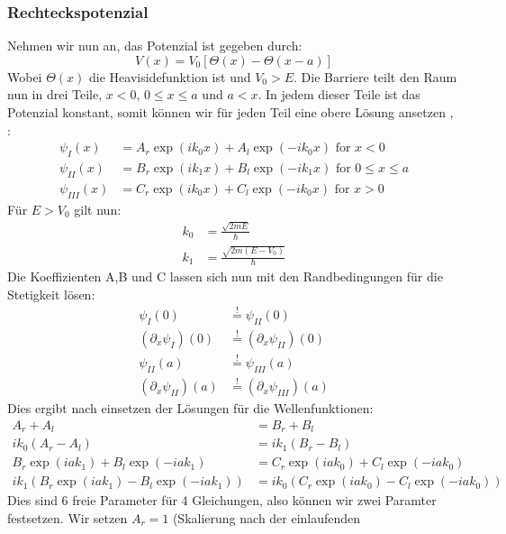 \subsubsection{Rechteckspotenzial}
Nehmen wir nun an, das Potenzial ist gegeben durch:
\begin{equation}
    V(x) = V_0 \left [ \Theta(x) - \Theta(x-a) \right ] 
\end{equation}
Wobei $\Theta(x)$ die Heavisidefunktion ist und $V_0 > E$.
Die Barriere teilt den Raum nun in drei Teile, $x<0$, $0\leqslant x\leqslant a$ und $a<x$.
In jedem dieser Teile ist das Potenzial konstant, somit können wir für jeden Teil eine
obere Lösung ansetzen \cite{wolfgang2010experimentalphysik},
\cite{landau1991quantenmechanik}:
\begin{align}
    \psi_I(x)    &= A_r \exp(ik_0x) + A_l  \exp(-ik_0x) \mbox{ for } x<0\\
    \psi_{II}(x) &= B_r \exp(ik_1x) + B_l  \exp(-ik_1x) \mbox{ for } 0 \leqslant x \leqslant a\\
    \psi_{III}(x)&= C_r \exp(ik_0x) + C_l  \exp(-ik_0x) \mbox{ for } x>0
\end{align}
Für $E>V_0$ gilt nun:
\begin{align}
    k_0 &= \frac{\sqrt{2mE}}{\hbar}\\
    k_1 &= \frac{\sqrt{2m(E-V_0)}}{\hbar}
\end{align}
Die Koeffizienten A,B und C lassen sich nun mit den Randbedingungen
für die Stetigkeit lösen:
\begin{align}
    \psi_I(0)&\overset{!}{=} \psi_{II}(0)\\
    (\partial_x\psi_I)(0)&\overset{!}{=} (\partial_x\psi_{II})(0)\\
    \psi_{II}(a)&\overset{!}{=} \psi_{III}(a)\\
    (\partial_x\psi_{II})(a)&\overset{!}{=} (\partial_x\psi_{III})(a)
\end{align}
Dies ergibt nach einsetzen der Lösungen für die Wellenfunktionen:
\begin{align}
  A_r + A_l &= B_r + B_l \\
  ik_0(A_r-A_l) &= ik_1(B_r-B_l)\\
  B_r\exp(iak_1)+B_l\exp(-iak_1)&=C_r \exp(iak_0)+C_l\exp(-iak_0)\\
  ik_1(B_r\exp(iak_1) - B_l\exp(-iak_1))&=ik_0(C_r\exp(iak_0)-C_l\exp(-iak_0))
\end{align}
Dies sind 6 freie Parameter für 4 Gleichungen, also können wir zwei 
Paramter festsetzen. Wir setzen $A_r =1$ (Skalierung nach der einlaufenden
